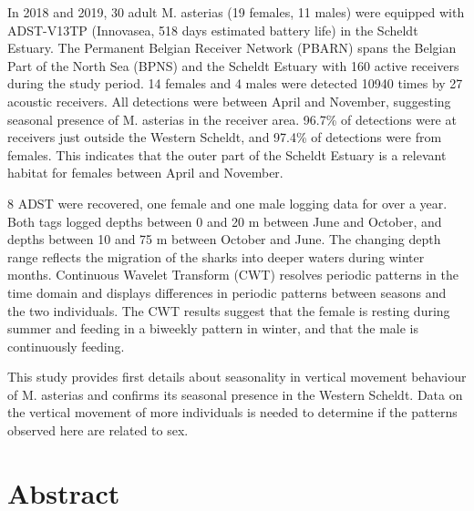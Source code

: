 \documentclass[
  authoryear,
  review,
  3p]{elsarticle}
\begin{document}
In 2018 and 2019, 30 adult M. asterias (19 females, 11 males) were
equipped with ADST-V13TP (Innovasea, 518 days estimated battery life) in
the Scheldt Estuary. The Permanent Belgian Receiver Network (PBARN)
spans the Belgian Part of the North Sea (BPNS) and the Scheldt Estuary
with 160 active receivers during the study period. 14 females and 4
males were detected 10940 times by 27 acoustic receivers. All detections
were between April and November, suggesting seasonal presence of M.
asterias in the receiver area. 96.7\% of detections were at receivers
just outside the Western Scheldt, and 97.4\% of detections were from
females. This indicates that the outer part of the Scheldt Estuary is a
relevant habitat for females between April and November.

8 ADST were recovered, one female and one male logging data for over a
year. Both tags logged depths between 0 and 20 m between June and
October, and depths between 10 and 75 m between October and June. The
changing depth range reflects the migration of the sharks into deeper
waters during winter months. Continuous Wavelet Transform (CWT) resolves
periodic patterns in the time domain and displays differences in
periodic patterns between seasons and the two individuals. The CWT
results suggest that the female is resting during summer and feeding in
a biweekly pattern in winter, and that the male is continuously feeding.

This study provides first details about seasonality in vertical movement
behaviour of M. asterias and confirms its seasonal presence in the
Western Scheldt. Data on the vertical movement of more individuals is
needed to determine if the patterns observed here are related to sex.

\hypertarget{abstract}{%
\section{Abstract}\label{abstract}}
\end{document}
